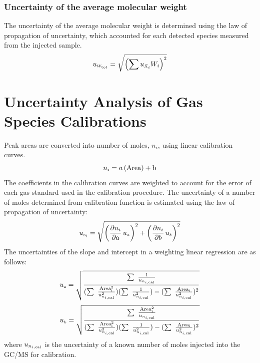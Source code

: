 \documentclass[12pt]{article}
\begin{document}
\subsubsection{Uncertainty of the average molecular weight}
\label{ssec:Uncertainty of the average molecular weight}

The uncertainty of the average molecular weight is determined using the law of propagation of uncertainty, which accounted for each detected species measured from the injected sample.
\begin{equation}\label{eq:Uncertainty_Total_MW}
	u_{\scriptscriptstyle W_{\rm{tot}}}=\sqrt{\left(\sum{{u_{\scriptscriptstyle \bar{X}_{i}}}{{W_{i}}}}\right)^2}
\end{equation}

\pagebreak

\section{Uncertainty Analysis of Gas Species Calibrations}\label{sec:Uncertainty Analysis of Gas Species Calibrations}

Peak areas are converted into number of moles, $n_{i}$, using linear calibration curves.
\begin{equation}
\label{eq:Calibration Curve}
n_{i\rm} = a \, (\rm {Area})+b
\end{equation}
The coefficients in the calibration curves are weighted to account for the error of each gas standard used in the calibration procedure. The uncertainty of a number of moles determined from calibration function is estimated using the law of propagation of uncertainty:
\begin{equation}
\label{eq:Given_Moles_Uncertainty}
 u_{\rm \scriptscriptstyle n_{i}} = \sqrt{{\left( \frac{\partial n_{i}}{\partial a}\,u_{\scriptscriptstyle a} \right)}^2+{\left(\frac{\partial {n_{i}}}{\partial b}\,u_{\scriptscriptstyle b}\right)}^2}
\end{equation}
The uncertainties of the slope and intercept in a weighting linear regression are as follows:
\begin{equation}
\label{eq:Slope_Uncertainty}
u_{\rm \scriptscriptstyle a} =\sqrt{\frac{\sum~\frac{1}{u_{n_{i,\rm cal}}}}{(\sum~\frac{\rm{Area}_{i}^2}{{u_{n_{i,\rm cal}}^2}})(\sum~\frac{1}{{u_{n_{i,\rm cal}}^2}})-(\sum~\frac{\rm{Area}_{i}}{{u_{n_{i,\rm cal}}^2}})^2}}
\end{equation}
\begin{equation}
\label{eq:Intercept_Uncertainty}
u_{\rm \scriptscriptstyle b} =\sqrt{\frac{\sum~\frac{\rm{Area}_{i}^2}{u_{n_{i,\rm cal}}}}{(\sum~\frac{\rm{Area}_{i}^2}{{u_{n_{i,\rm cal}}^2}})(\sum~\frac{1}{{u_{n_{i,\rm cal}}^2}})-(\sum~\frac{\rm{Area}_{i}}{{u_{n_{i,\rm cal}}^2}})^2}}
\end{equation}
where $u_{n_{i,\rm cal}}$ is the uncertainty of a known number of moles injected into the GC/MS for calibration.
\end{document}
